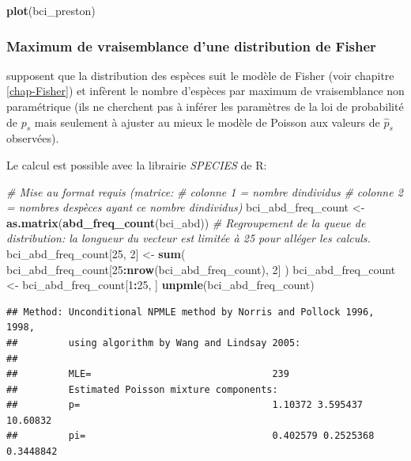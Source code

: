 \documentclass[
  11pt,
  american,
  a4paper,
  extrafontsizes,onecolumn,openright
  ]{memoir}
\newenvironment{Shaded}{\begin{snugshade}}{\end{snugshade}}
\newcommand{\CommentTok}[1]{\textcolor[rgb]{0.56,0.35,0.01}{\textit{#1}}}
\newcommand{\DecValTok}[1]{\textcolor[rgb]{0.00,0.00,0.81}{#1}}
\newcommand{\FunctionTok}[1]{\textcolor[rgb]{0.13,0.29,0.53}{\textbf{#1}}}
\newcommand{\NormalTok}[1]{#1}
\newcommand{\OtherTok}[1]{\textcolor[rgb]{0.56,0.35,0.01}{#1}}
\newcommand{\SpecialCharTok}[1]{\textcolor[rgb]{0.81,0.36,0.00}{\textbf{#1}}}
\begin{document}
\begin{Shaded}
\begin{Highlighting}[]
\FunctionTok{plot}\NormalTok{(bci\_preston)}
\end{Highlighting}
\end{Shaded}

\normalsize

\subsubsection{Maximum de vraisemblance d'une distribution de Fisher}\label{maximum-de-vraisemblance-dune-distribution-de-fisher}

\textcite{Norris1998} supposent que la distribution des espèces suit le modèle de Fisher (voir chapitre \ref{chap-Fisher}) et infèrent le nombre d'espèces par maximum de vraisemblance non paramétrique (ils ne cherchent pas à inférer les paramètres de la loi de probabilité de \(p_s\) mais seulement à ajuster au mieux le modèle de Poisson aux valeurs de \({\hat{p}}_s\) observées).

Le calcul est possible avec la librairie \emph{SPECIES} de R:

\scriptsize

\begin{Shaded}
\begin{Highlighting}[]
\CommentTok{\# Mise au format requis (matrice:}
\CommentTok{\# colonne 1 = nombre d\textquotesingle{}individus}
\CommentTok{\# colonne 2 = nombres d\textquotesingle{}espèces ayant ce nombre d\textquotesingle{}individus)}
\NormalTok{bci\_abd\_freq\_count }\OtherTok{\textless{}{-}} \FunctionTok{as.matrix}\NormalTok{(}\FunctionTok{abd\_freq\_count}\NormalTok{(bci\_abd))}
\CommentTok{\# Regroupement de la queue de distribution: la longueur du vecteur est limitée à 25 pour alléger les calculs.}
\NormalTok{bci\_abd\_freq\_count[}\DecValTok{25}\NormalTok{, }\DecValTok{2}\NormalTok{] }\OtherTok{\textless{}{-}} \FunctionTok{sum}\NormalTok{(}
\NormalTok{  bci\_abd\_freq\_count[}\DecValTok{25}\SpecialCharTok{:}\FunctionTok{nrow}\NormalTok{(bci\_abd\_freq\_count), }\DecValTok{2}\NormalTok{]}
\NormalTok{)}
\NormalTok{bci\_abd\_freq\_count }\OtherTok{\textless{}{-}}\NormalTok{ bci\_abd\_freq\_count[}\DecValTok{1}\SpecialCharTok{:}\DecValTok{25}\NormalTok{, ]}
\FunctionTok{unpmle}\NormalTok{(bci\_abd\_freq\_count)}
\end{Highlighting}
\end{Shaded}

\begin{verbatim}
## Method: Unconditional NPMLE method by Norris and Pollock 1996, 1998, 
##         using algorithm by Wang and Lindsay 2005: 
## 
##         MLE=                                239 
##         Estimated Poisson mixture components:       
##         p=                                  1.10372 3.595437 10.60832 
##         pi=                                 0.402579 0.2525368 0.3448842
\end{verbatim}
\end{document}
